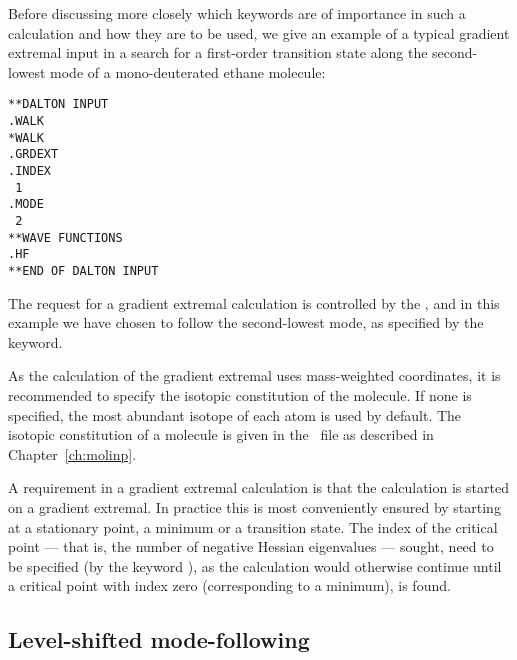 Before discussing more closely which keywords are of importance in
such a calculation and how they are to be used, we give an example of
a typical gradient extremal input in a search for a first-order
transition state along the second-lowest mode of a mono-deuterated
ethane molecule:

\begin{verbatim}
**DALTON INPUT
.WALK
*WALK
.GRDEXT
.INDEX
 1
.MODE
 2
**WAVE FUNCTIONS
.HF
**END OF DALTON INPUT
\end{verbatim}


The request for a gradient extremal
calculation is controlled by the {}, and in this example
we have chosen to follow the second-lowest mode, as specified by the
 keyword.

As the calculation of the gradient extremal uses mass-weighted
coordinates, it is recommended to
specify the isotopic constitution of
the molecule. If none is specified, the most abundant
isotope of each atom is used by default. The isotopic constitution of
a molecule is given in the \molinp\ file as described in Chapter~\ref{ch:molinp}.

A requirement in a gradient extremal calculation is that the
calculation is started on a gradient extremal. In practice this is
most conveniently ensured by starting at a stationary point, a minimum
or a transition state. The index of the critical point
--- that is,
the number of negative Hessian eigenvalues
--- sought, need to
be specified (by the keyword ), as the calculation would
otherwise continue until a critical point with index zero
(corresponding to a minimum), is found.

\subsection{Level-shifted mode-following}\label{sec:modfol}

\begin{center}
\end{center}

